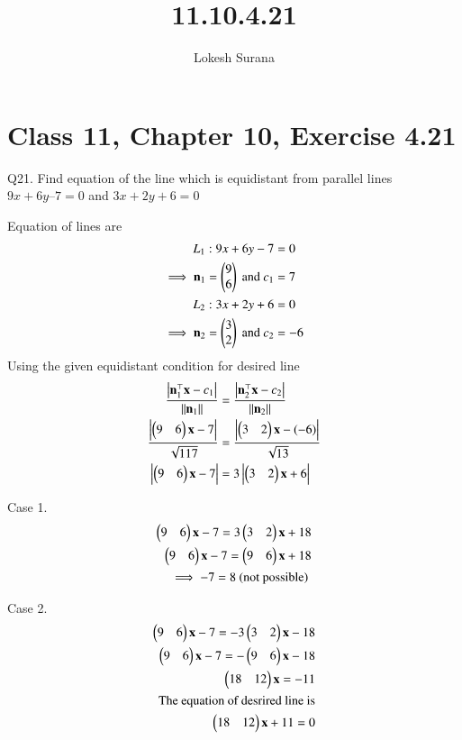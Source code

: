 \documentclass[journal,12pt,twocolumn]{IEEEtran}
\renewcommand{\vec}[1]{\boldsymbol{\mathbf{#1}}}
\begin{document}
\vspace{3cm}
\title{11.10.4.21}
\author{Lokesh Surana}
\maketitle
\section*{Class 11, Chapter 10, Exercise 4.21}

Q21. Find equation of the line which is equidistant from parallel lines $9{x} + 6{y} – 7 = 0$ and $3{x} + 2{y} + 6 = 0$

\solution Equation of lines are
\begin{align}
    {L}_1: 9{x} + 6{y} - 7 &= 0\\
    \implies \vec{n}_1 = \myvec{9\\6} \text{ and } {c}_1 &= 7\\
    {L}_2: 3{x} + 2{y} + 6 &= 0 \\
    \implies \vec{n}_2 = \myvec{3\\2} \text{ and } {c}_2 &= -6
\end{align}
Using the given equidistant condition for desired line
\begin{align}
    \frac{\abs{  \vec{n}_1^{\top}\vec{x}-{c}_1 }}{\norm{\vec{n}_1}} &= \frac{\abs{  \vec{n}_2^{\top}\vec{x}-{c}_2 }}{\norm{\vec{n}_2}} \\
    \frac{\abs{\myvec{9&6}\vec{x} - 7}}{\sqrt{117}} &= \frac{\abs{\myvec{3&2}\vec{x} - (-6)}}{\sqrt{13}}\\
    \abs{\myvec{9&6}\vec{x} - 7} &= 3\abs{\myvec{3&2}\vec{x}  + 6}
\end{align}

Case 1.
\begin{align}
    \myvec{9&6}\vec{x} - 7 = 3\myvec{3&2}\vec{x}  + 18 \\
    \myvec{9&6}\vec{x} - 7 = \myvec{9&6}\vec{x}  + 18 \\
    \implies -7 = 8
    \text{ (not possible) } 
\end{align}

Case 2.
\begin{align}
    \myvec{9&6}\vec{x} - 7 = -3\myvec{3&2}\vec{x}  - 18 \\
    \myvec{9&6}\vec{x} - 7 = -\myvec{9&6}\vec{x}  - 18 \\
    \myvec{18&12}\vec{x} = -11\\
    \text{The equation of desrired line is}\\
    \myvec{18&12}\vec{x}  + 11 = 0
\end{align}
\end{document}
